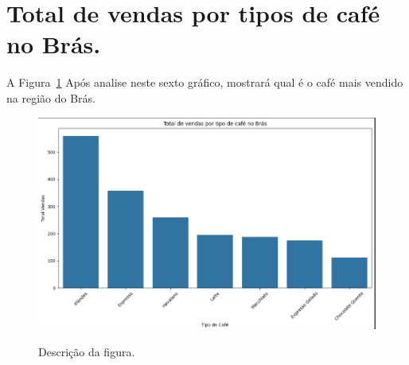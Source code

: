 \section{Total de vendas por tipos de café no Brás.}
\label{sec:figura}
A Figura~\ref{figuras/Total-vendas-Bras.png} Após analise neste sexto gráfico, mostrará qual é o café mais vendido na região do Brás.
\begin{figure}[!ht]
	{\centering
		\caption{Descrição da figura.}
		\includegraphics[width=1.0\textwidth]{figuras/Total-vendas-Bras.png}
		\label{figuras/Total-vendas-Bras.png}
	}
\end{figure} \\ \\ \\ \\ \\ \\ \\ \\ \\ \\ \\ \\ 

